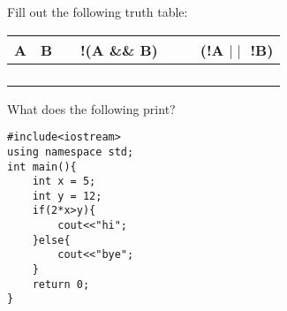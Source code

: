 \documentclass[addpoints,12pt]{exam}
\begin{document}

\begin{center}
\end{center}
\vspace{0.1in}
\begin{center}
\gradetable[h][questions]
\end{center}

\begin{questions}
\question [5]
Fill out the following truth table:\\
\begin{center}
\begin{tabular}{|c|c|c|c|c|c|c|}
	\hline
	A &  B  & \hspace{50pt} & !(A \&\& B)  &  \hspace{10pt} &\hspace{10pt}   & (!A $\mid\mid$ !B) \\
	\hline
	 & & & & &  &\\
	\hline
	 & & & & &  &\\
	\hline
	 & & & & &  &\\
	\hline
	 & & & & &  &\\
	\hline
\end{tabular}
\end{center}

\question[5]
What does the following print?
 \lstset{language=C++}
\begin{lstlisting}
#include<iostream>
using namespace std;
int main(){
	int x = 5;
	int y = 12;
	if(2*x>y){
		cout<<"hi";
	}else{
		cout<<"bye";
	}
	return 0;
}
\end{lstlisting}
\end{questions}
\end{document}
